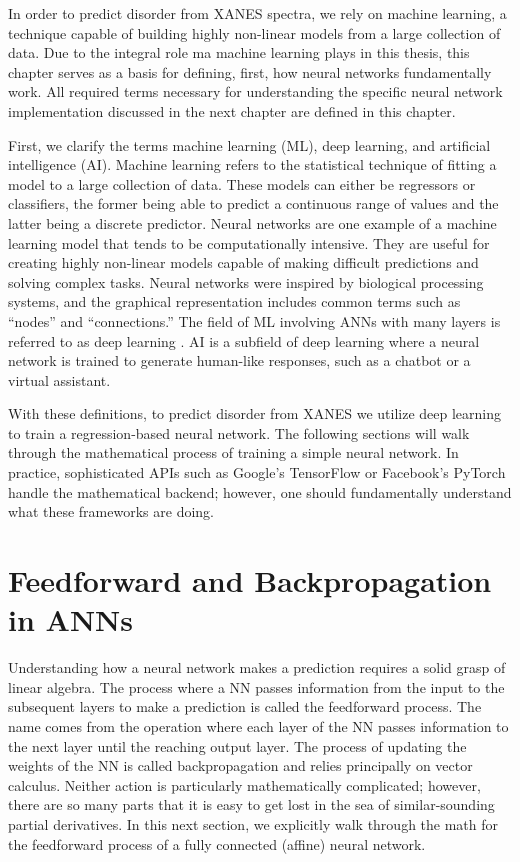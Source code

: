 In order to predict disorder from XANES spectra, we rely on machine learning, a technique capable of building highly non-linear models from a large collection of data. Due to the integral role ma machine learning plays in this thesis, this chapter serves as a basis for defining, first, how neural networks fundamentally work. All required terms necessary for understanding the specific neural network implementation discussed in the next chapter are defined in this chapter.

First, we clarify the terms machine learning (ML), deep learning, and artificial intelligence (AI). Machine learning refers to the statistical technique of fitting a model to a large collection of data. These models can either be regressors or classifiers, the former being able to predict a continuous range of values and the latter being a discrete predictor. Neural networks are one example of a machine learning model that tends to be computationally intensive. They are useful for creating highly non-linear models capable of making difficult predictions and solving complex tasks. Neural networks were inspired by biological processing systems, and the graphical representation includes common terms such as ``nodes'' and ``connections.'' The field of ML involving ANNs with many layers is referred to as deep learning \cite{schmidhuber2015deep}. AI is a subfield of deep learning where a neural network is trained to generate human-like responses, such as a chatbot or a virtual assistant. 

With these definitions, to predict disorder from XANES we utilize deep learning to train a regression-based neural network. The following sections will walk through the mathematical process of training a simple neural network. In practice, sophisticated APIs such as Google's TensorFlow \cite{tensorflow2015-whitepaper} or Facebook's PyTorch \cite{pytorch-paper}  handle the mathematical backend; however, one should fundamentally understand what these frameworks are doing.
\section{Feedforward and Backpropagation in ANNs}

Understanding how a neural network makes a prediction requires a solid grasp of linear algebra. The process where a NN passes information from the input to the subsequent layers to make a prediction is called the feedforward process. The name comes from the operation where each layer of the NN passes information to the next layer until the reaching output layer. The process of updating the weights of the NN is called backpropagation and relies principally on vector calculus. Neither action is particularly mathematically complicated; however, there are so many parts that it is easy to get lost in the sea of similar-sounding partial derivatives. In this next section, we explicitly walk through the math for the feedforward process of a fully connected (affine) neural network.

